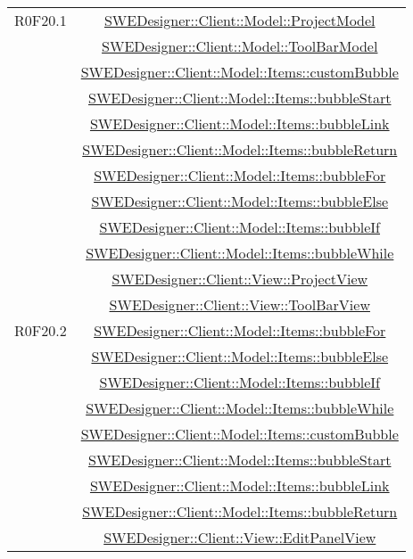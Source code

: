 \documentclass[../DefinizioneDiProdotto.tex]{subfiles}
\begin{document}
\begin{longtable}{|c|c|}
				R0F20.1
				& \hyperlink{SWEDesigner::Client::Model::ProjectModel}{SWEDesigner::Client::Model::ProjectModel}\\
				& \hyperlink{SWEDesigner::Client::Model::ToolBarModel}{SWEDesigner::Client::Model::ToolBarModel}\\
				& \hyperlink{SWEDesigner::Client::Model::Items::customBubble}{SWEDesigner::Client::Model::Items::customBubble}\\
				& \hyperlink{SWEDesigner::Client::Model::Items::bubbleStart}{SWEDesigner::Client::Model::Items::bubbleStart}\\
				& \hyperlink{SWEDesigner::Client::Model::Items::bubbleLink}{SWEDesigner::Client::Model::Items::bubbleLink}\\
				& \hyperlink{SWEDesigner::Client::Model::Items::bubbleReturn}{SWEDesigner::Client::Model::Items::bubbleReturn}\\
				& \hyperlink{SWEDesigner::Client::Model::Items::bubbleFor}{SWEDesigner::Client::Model::Items::bubbleFor}\\
				& \hyperlink{SWEDesigner::Client::Model::Items::bubbleElse}{SWEDesigner::Client::Model::Items::bubbleElse}\\
				& \hyperlink{SWEDesigner::Client::Model::Items::bubbleIf}{SWEDesigner::Client::Model::Items::bubbleIf}\\
				& \hyperlink{SWEDesigner::Client::Model::Items::bubbleWhile}{SWEDesigner::Client::Model::Items::bubbleWhile}\\
				& \hyperlink{SWEDesigner::Client::View::ProjectView}{SWEDesigner::Client::View::ProjectView}\\
				& \hyperlink{SWEDesigner::Client::View::ToolBarView}{SWEDesigner::Client::View::ToolBarView}\\
				\hline

				R0F20.2
				& \hyperlink{SWEDesigner::Client::Model::Items::bubbleFor}{SWEDesigner::Client::Model::Items::bubbleFor}\\
				& \hyperlink{SWEDesigner::Client::Model::Items::bubbleElse}{SWEDesigner::Client::Model::Items::bubbleElse}\\
				& \hyperlink{SWEDesigner::Client::Model::Items::bubbleIf}{SWEDesigner::Client::Model::Items::bubbleIf}\\
				& \hyperlink{SWEDesigner::Client::Model::Items::bubbleWhile}{SWEDesigner::Client::Model::Items::bubbleWhile}\\
				& \hyperlink{SWEDesigner::Client::Model::Items::customBubble}{SWEDesigner::Client::Model::Items::customBubble}\\
				& \hyperlink{SWEDesigner::Client::Model::Items::bubbleStart}{SWEDesigner::Client::Model::Items::bubbleStart}\\
				& \hyperlink{SWEDesigner::Client::Model::Items::bubbleLink}{SWEDesigner::Client::Model::Items::bubbleLink}\\
				& \hyperlink{SWEDesigner::Client::Model::Items::bubbleReturn}{SWEDesigner::Client::Model::Items::bubbleReturn}\\
				& \hyperlink{SWEDesigner::Client::View::EditPanelView}{SWEDesigner::Client::View::EditPanelView}\\
				\hline


\end{longtable}
\end{document}
